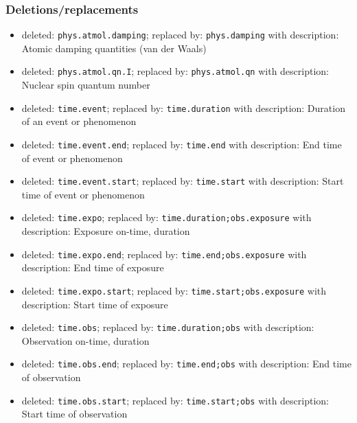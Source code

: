 \documentclass[11pt,a4paper]{ivoa}
\begin{document}
\subsubsection*{Deletions/replacements}
\begin{itemize}
\item deleted: {\tt phys.atmol.damping}; replaced by: {\tt phys.damping} with description: Atomic damping quantities (van der Waals)
\item deleted: {\tt phys.atmol.qn.I}; replaced by: {\tt phys.atmol.qn} with description: Nuclear spin quantum number
\item deleted: {\tt time.event}; replaced by: {\tt time.duration} with description: Duration of an event or phenomenon
\item deleted: {\tt time.event.end}; replaced by: {\tt time.end} with description: End time of event or phenomenon
\item deleted: {\tt time.event.start}; replaced by: {\tt time.start} with description: Start time of event or phenomenon
\item deleted: {\tt time.expo}; replaced by: {\tt time.duration;obs.exposure} with description: Exposure on-time, duration
\item deleted: {\tt time.expo.end}; replaced by: {\tt time.end;obs.exposure} with description: End time of exposure
\item deleted: {\tt time.expo.start}; replaced by: {\tt time.start;obs.exposure} with description: Start time of exposure
\item deleted: {\tt time.obs}; replaced by: {\tt time.duration;obs} with description: Observation on-time, duration
\item deleted: {\tt time.obs.end}; replaced by: {\tt time.end;obs} with description: End time of observation
\item deleted: {\tt time.obs.start}; replaced by: {\tt time.start;obs} with description: Start time of observation
\end{itemize}
\end{document}
